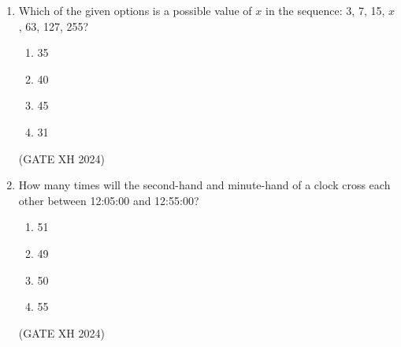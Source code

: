 \documentclass{article}
\begin{document}
\begin{enumerate}
    \item Which of the given options is a possible value of $x$ in the sequence: 3, 7, 15, $x$, 63, 127, 255?

    \begin{multicols}{4}
        \begin{enumerate}
            \item 35
            \item 40
            \item 45
            \item 31
        \end{enumerate}
    \end{multicols} \hfill (GATE XH 2024)

    \item How many times will the second-hand and minute-hand of a clock cross each other between 12:05:00 and 12:55:00?

    \begin{multicols}{4}
        \begin{enumerate}
            \item 51
            \item 49
            \item 50
            \item 55
        \end{enumerate}
    \end{multicols} \hfill (GATE XH 2024)
\end{enumerate}
\end{document}
